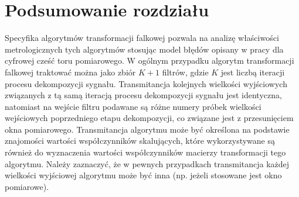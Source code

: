 \section{Podsumowanie rozdziału}

Specyfika algorytmów transformacji falkowej pozwala na analizę właściwości metrologicznych tych algorytmów stosując model błędów opisany w pracy dla cyfrowej cześć toru pomiarowego. W ogólnym przypadku algorytm transformacji falkowej traktować można jako zbiór $K+1$ filtrów, gdzie $K$ jest liczbą iteracji procesu dekompozycji sygnału. Transmitancja kolejnych wielkości wyjściowych związanych z tą samą iteracją procesu dekompozycji sygnału jest identyczna, natomiast na wejście filtru podawane są różne numery próbek wielkości wejściowych poprzedniego etapu dekompozycji, co związane jest z przesunięciem okna pomiarowego. Transmitancja algorytmu może być określona na podstawie znajomości wartości współczynników skalujących, które wykorzystywane są również do wyznaczenia wartości współczynników macierzy transformacji tego algorytmu. Należy zaznaczyć, że w pewnych przypadkach transmitancja każdej wielkości wyjściowej algorytmu może być inna (np. jeżeli stosowane jest okno pomiarowe).
